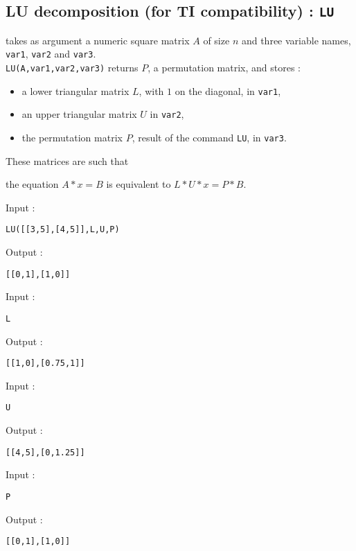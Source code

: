 \documentclass[a4paper,11pt]{book}
\begin{document}
\subsection{LU decomposition (for TI compatibility) : {\tt LU}}
 takes as argument a numeric
square matrix $A$ of size $n$ and three variable names, {\tt var1}, 
{\tt var2} and {\tt var3}.\\
{\tt LU(A,var1,var2,var3)} returns $P$, a permutation matrix, and stores :
\begin{itemize}
\item a lower triangular matrix $L$, with $1$ on the diagonal, in 
{\tt var1},
\item an upper triangular matrix $U$ in {\tt var2},
\item the permutation matrix $P$, result of the command {\tt LU}, in 
{\tt var3}.
\end{itemize}
These matrices are such that 
\begin{center}
the equation $A*x=B$ is equivalent to $L*U*x=P*B$.
\end{center}
Input :
\begin{center}{\tt LU([[3,5],[4,5]],L,U,P)}\end{center}
Output :
\begin{center}{\tt [[0,1],[1,0]]}\end{center}
Input :
\begin{center}{\tt L}\end{center}
Output :
\begin{center}{\tt [[1,0],[0.75,1]]}\end{center}
Input :
\begin{center}{\tt U}\end{center}
Output :
\begin{center}{\tt [[4,5],[0,1.25]]}\end{center}
Input :
\begin{center}{\tt P}\end{center}
Output :
\begin{center}{\tt [[0,1],[1,0]]}\end{center}
\end{document}
